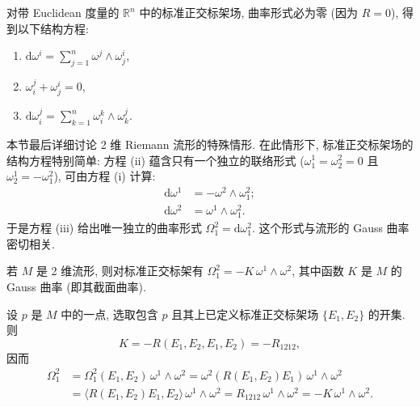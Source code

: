 \begin{RiemannExample}\label{ex:cartan-equations-in-euclidean-space}
对带 Euclidean 度量的 $\mathbb{R}^n$ 中的标准正交标架场, 曲率形式必为零 (因为 $R=0$), 得到以下结构方程:
\begin{enumerate}[label=(\roman*),leftmargin=*]
\item $\mathrm{d}\omega^i=\sum_{j=1}^n\omega^j\wedge\omega_j^i$,
\item $\omega_i^j+\omega_j^i=0$,
\item $\mathrm{d}\omega_i^j=\sum_{k=1}^n\omega_i^k\wedge\omega_k^j$.
\end{enumerate}
\end{RiemannExample}

本节最后详细讨论 2 维 Riemann 流形的特殊情形. 在此情形下, 标准正交标架场的结构方程特别简单: 方程 (ii) 蕴含只有一个独立的联络形式 ($\omega_1^1=\omega_2^2=0$ 且 $\omega_2^1=-\omega_1^2$), 可由方程 (i) 计算:
\begin{align*}
  \mathrm{d}\omega^1&=-\omega^2\wedge\omega_1^2;\\
  \mathrm{d}\omega^2&=\omega^1\wedge\omega_1^2.
\end{align*}
于是方程 (iii) 给出唯一独立的曲率形式 $\Omega_1^2=\mathrm{d}\omega_1^2$. 这个形式与流形的 Gauss 曲率密切相关.

\begin{RiemannProposition}\label{prop:curvature-form-and-gauss-curvature}
若 $M$ 是 2 维流形, 则对标准正交标架有 $\Omega_1^2=-K\,\omega^1\wedge\omega^2$, 其中函数 $K$ 是 $M$ 的 Gauss 曲率 (即其截面曲率).
\end{RiemannProposition}

\begin{RiemannProof}
设 $p$ 是 $M$ 中的一点, 选取包含 $p$ 且其上已定义标准正交标架场 $\{E_1,E_2\}$ 的开集. 则
\[
  K=-R(E_1,E_2,E_1,E_2)=-R_{1212},
\]
因而
\begin{align*}
  \Omega_1^2&=\Omega_1^2(E_1,E_2)\,\omega^1\wedge\omega^2
    =\omega^2(R(E_1,E_2)E_1)\,\omega^1\wedge\omega^2\\
  &=\langle R(E_1,E_2)E_1,E_2\rangle\,\omega^1\wedge\omega^2
    =R_{1212}\,\omega^1\wedge\omega^2=-K\,\omega^1\wedge\omega^2.
\end{align*}
\end{RiemannProof}

